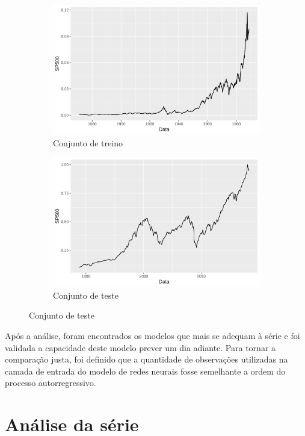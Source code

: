 \documentclass[
    12pt,
    oneside,
    a4paper,
    english,
    brazil
]{abntex2}
\begin{document}
\begin{figure}[ht]
    \caption{Divisão da série entre os conjuntos de treino e teste}\label{fig:traintest}
    \begin{subfigure}{.5\textwidth}
        \centering
        \includegraphics[width=.8\linewidth]{images/SP500_train.png}
        \caption{Conjunto de treino}
    \end{subfigure}
    \begin{subfigure}{.5\textwidth}
        \centering
        \includegraphics[width=.8\linewidth]{images/SP500_test.png}
        \caption{Conjunto de teste}
    \end{subfigure}
\end{figure}

Após a análise, foram encontrados os modelos  que mais se adequam à série e foi
validada  a capacidade  deste  modelo  prever um  dia  adiante.  Para tornar  a
comparação justa,  foi definido que  a quantidade de observações  utilizadas na
camada  de entrada  do modelo  de  redes neurais  fosse semelhante  a ordem  do
processo autorregressivo.

\section{Análise da série}
\end{document}
